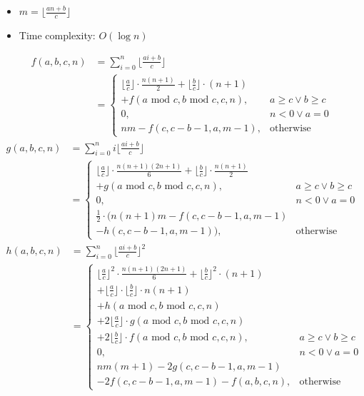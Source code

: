 \begin{itemize}
  \itemsep-0.5em
  \item $m = \lfloor\frac{an + b}{c}\rfloor$
  \item Time complexity: $O(\log{n})$
\end{itemize}

$$ \begin{aligned}
  f(a, b, c, n) &= \sum_{i = 0}^{n}\lfloor\frac{ai + b}{c}\rfloor \\
  &= \begin{cases} 
    \lfloor\frac{a}{c}\rfloor \cdot \frac{n(n + 1)}{2} + \lfloor\frac{b}{c}\rfloor \cdot (n + 1) \\ + f(a\text{ mod } c, b\text{ mod } c, c, n), & a \geq c \lor b \geq c \\ 
    0, & n < 0 \lor a = 0 \\
    nm - f(c, c - b - 1, a, m - 1), & \text{otherwise} 
  \end{cases} 
\end{aligned} $$
$$ \begin{aligned}
  g(a, b, c, n) &= \sum_{i = 0}^{n}i\lfloor\frac{ai + b}{c}\rfloor \\
  &= \begin{cases}
    \lfloor{\frac{a}{c}}\rfloor \cdot \frac{n(n + 1)(2n + 1)}{6} + \lfloor\frac{b}{c}\rfloor \cdot \frac{n(n + 1)}{2} \\ + g(a\text{ mod } c, b\text{ mod } c, c, n), & a \geq c \lor b \geq c \\
    0, & n < 0 \lor a = 0 \\
    \frac{1}{2} \cdot (n(n + 1)m - f(c, c - b - 1, a, m - 1) \\ - h(c, c - b - 1, a, m - 1)), & \text{otherwise}
  \end{cases}
\end{aligned} $$
$$ \begin{aligned}
  h(a, b, c, n) &= \sum_{i = 0}^{n}\lfloor\frac{ai + b}{c}\rfloor^2 \\
  &= \begin{cases}
    \lfloor\frac{a}{c}\rfloor^2 \cdot \frac{n(n + 1)(2n + 1)}{6} + \lfloor\frac{b}{c}\rfloor^2 \cdot (n + 1) \\ + \lfloor\frac{a}{c}\rfloor \cdot \lfloor\frac{b}{c}\rfloor \cdot n(n + 1) \\ + h(a\text{ mod } c, b\text{ mod } c, c, n) \\ + 2\lfloor\frac{a}{c}\rfloor \cdot g(a\text{ mod } c, b\text{ mod } c, c, n) \\ + 2\lfloor\frac{b}{c}\rfloor \cdot f(a\text{ mod } c, b\text{ mod } c, c, n), & a \geq c \lor b \geq c \\
    0, & n < 0 \lor a = 0 \\
    nm(m + 1) - 2g(c, c - b - 1, a, m - 1) \\ - 2f(c, c - b - 1, a, m - 1) - f(a, b, c, n), & \text{otherwise}
  \end{cases}
\end{aligned} $$

